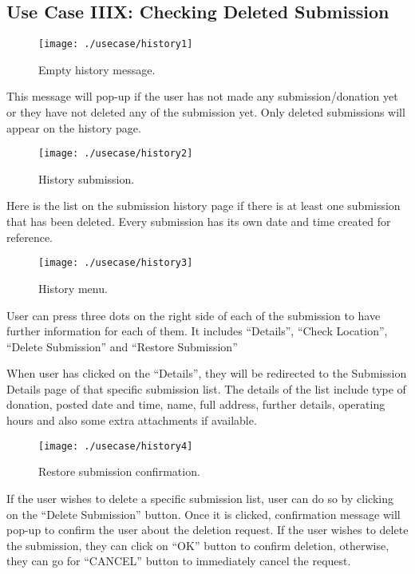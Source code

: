 \documentclass[conference]{IEEEtran}
\begin{document}
\subsection{Use Case IIIX: Checking Deleted Submission }

\begin{figure}[h!]
\texttt{[image: ./usecase/history1]}
\centering
\caption{Empty history message.}
\end{figure}

This message will pop-up if the user has not made any submission/donation yet or they have not deleted any of the submission yet. Only deleted submissions will appear on the history page.

\begin{figure}[h!]
\texttt{[image: ./usecase/history2]}
\centering
\caption{History submission.}
\end{figure}

Here is the list on the submission history page if there is at least one submission that has been deleted. Every submission has its own date and time created for reference.
\begin{figure}[h!]
\texttt{[image: ./usecase/history3]}
\centering
\caption{History menu.}
\end{figure}

User can press three dots on the right side of each of the submission to have further information for each of them. It includes “Details”, “Check Location”, “Delete Submission” and “Restore Submission”

When user has clicked on the “Details”, they will be redirected to the Submission Details page of that specific submission list. The details of the list include type of donation, posted date and time, name, full address, further details, operating hours and also some extra attachments if available.

\begin{figure}[h!]
\texttt{[image: ./usecase/history4]}
\centering
\caption{Restore submission confirmation.}
\end{figure}

If the user wishes to delete a specific submission list, user can do so by clicking on the “Delete Submission” button. Once it is clicked, confirmation message will pop-up to confirm the user about the deletion request. If the user wishes to delete the submission, they can click on “OK” button to confirm deletion, otherwise, they can go for “CANCEL” button to immediately cancel the request.
\end{document}
